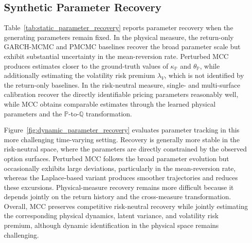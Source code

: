 \documentclass[sigconf,anonymous,review]{acmart}
\begin{document}

\subsection{Synthetic Parameter Recovery}

Table~\ref{tab:static_parameter_recovery} reports parameter recovery when the generating parameters remain fixed. In the physical measure, the return-only GARCH-MCMC and PMCMC baselines recover the broad parameter scale but exhibit substantial uncertainty in the mean-reversion rate. Perturbed MCC produces estimates closer to the ground-truth values of \(\kappa_{\mathbb{P}}\) and \(\theta_{\mathbb{P}}\), while additionally estimating the volatility risk premium \(\lambda_V\), which is not identified by the return-only
baselines. In the risk-neutral measure, single- and multi-surface calibration recover the directly identifiable pricing parameters reasonably well, while MCC obtains comparable estimates through the learned physical parameters and the
\(\mathbb{P}\)-to-\(\mathbb{Q}\) transformation.

Figure~\ref{fig:dynamic_parameter_recovery} evaluates parameter tracking in this more challenging time-varying setting. Recovery is generally more stable in the risk-neutral space, where the parameters are directly constrained by the observed option surfaces. Perturbed MCC follows the broad parameter evolution but occasionally exhibits large
deviations, particularly in the mean-reversion rate, whereas the Laplace-based variant produces smoother trajectories and reduces these excursions. Physical-measure recovery remains more difficult because it depends jointly on the return history and the cross-measure transformation. Overall, MCC preserves competitive risk-neutral recovery while jointly estimating the corresponding physical dynamics, latent variance, and volatility risk premium, although dynamic identification in the physical space remains challenging.
\end{document}

